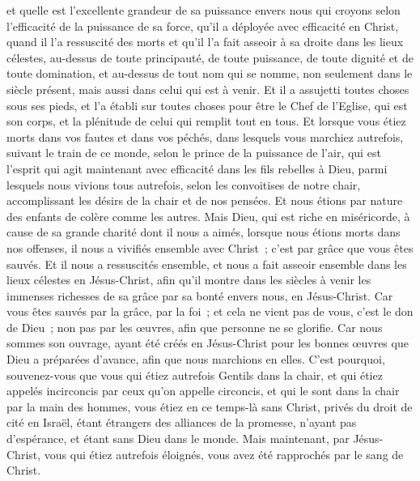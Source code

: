 \begin{multicols}{2}
et quelle est l'excellente grandeur de sa puissance envers nous qui croyons selon l'efficacité de la puissance de sa force,
qu'il a déployée avec efficacité en Christ, quand il l'a ressuscité des morts et qu'il l'a fait asseoir à sa droite dans les lieux célestes,
au-dessus de toute principauté, de toute puissance, de toute dignité et de toute domination, et au-dessus de tout nom qui se nomme, non seulement dans le siècle présent, mais aussi dans celui qui est à venir.
Et il a assujetti toutes choses sous ses pieds, et l'a établi sur toutes choses pour être le Chef de l'Eglise,
qui est son corps, et la plénitude de celui qui remplit tout en tous.
\VerseOne{}Et lorsque vous étiez morts dans vos fautes et dans vos péchés,
dans lesquels vous marchiez autrefois, suivant le train de ce monde, selon le prince de la puissance de l'air, qui est l'esprit qui agit maintenant avec efficacité dans les fils rebelles à Dieu,
parmi lesquels nous vivions tous autrefois, selon les convoitises de notre chair, accomplissant les désirs de la chair et de nos pensées. Et nous étions par nature des enfants de colère comme les autres.
Mais Dieu, qui est riche en miséricorde, à cause de sa grande charité dont il nous a aimés,
lorsque nous étions morts dans nos offenses, il nous a vivifiés ensemble avec Christ~; c'est par grâce que vous êtes sauvés.
Et il nous a ressuscités ensemble, et nous a fait asseoir ensemble dans les lieux célestes en Jésus-Christ,
afin qu'il montre dans les siècles à venir les immenses richesses de sa grâce par sa bonté envers nous, en Jésus-Christ.
Car vous êtes sauvés par la grâce, par la foi~; et cela ne vient pas de vous, c'est le don de Dieu~;
non pas par les œuvres, afin que personne ne se glorifie.
Car nous sommes son ouvrage, ayant été créés en Jésus-Christ pour les bonnes œuvres que Dieu a préparées d'avance, afin que nous marchions en elles.
C'est pourquoi, souvenez-vous que vous qui étiez autrefois Gentils dans la chair, et qui étiez appelés incirconcis par ceux qu'on appelle circoncis, et qui le sont dans la chair par la main des hommes,
vous étiez en ce temps-là sans Christ, privés du droit de cité en Israël, étant étrangers des alliances de la promesse, n'ayant pas d'espérance, et étant sans Dieu dans le monde.
Mais maintenant, par Jésus-Christ, vous qui étiez autrefois éloignés, vous avez été rapprochés par le sang de Christ.

\end{multicols}
